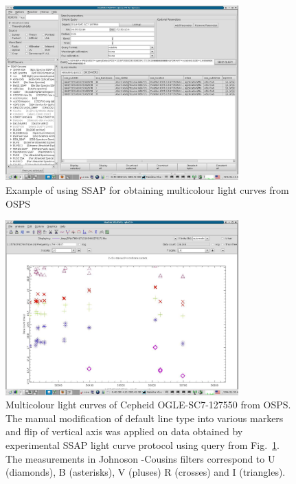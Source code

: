\documentclass[final,authoryear,5p,times,twocolumn]{elsarticle}
\begin{document}
\begin{figure}[t]
\begin{center}
\includegraphics[width=0.8\textwidth]{OGLE-SC7-127550_query.pdf}
\caption{Example of using SSAP for obtaining multicolour light curves from OSPS}
\label{fig:OGLE-SC7-127550_query}
\end{center}
\end{figure}

\begin{figure}[t]
\begin{center}
\includegraphics[width=0.8\textwidth]{OGLE-SC7-127550_plot.pdf}
\caption{Multicolour light curves of Cepheid OGLE-SC7-127550 from OSPS. The manual modification of default line type into various markers and flip of vertical axis was applied on data obtained by experimental SSAP light curve protocol using query from Fig.~\ref{fig:OGLE-SC7-127550_query}. The measurements in Johnoson -Cousins filters correspond to U (diamonds), B (asterisks), V (pluses) R (crosses) and I (triangles).
}
\label{fig:OGLE-SC7-127550_plot}
\end{center}
\end{figure}
\end{document}
